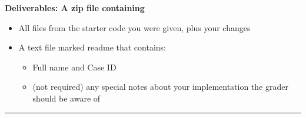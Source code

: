 \documentclass[a4paper, 11pt]{article}
\begin{document}
\bf{Deliverables:} A zip file containing
\begin{itemize}
    \item All files from the starter code you were given, plus your changes
    \item A text file marked readme that contains:
    \begin{itemize}
        \item Full name and Case ID
        \item (not required) any special notes about your implementation the grader should be aware of
    \end{itemize}
\end{itemize}

\noindent\rule{7in}{2.8pt}
\end{document}
